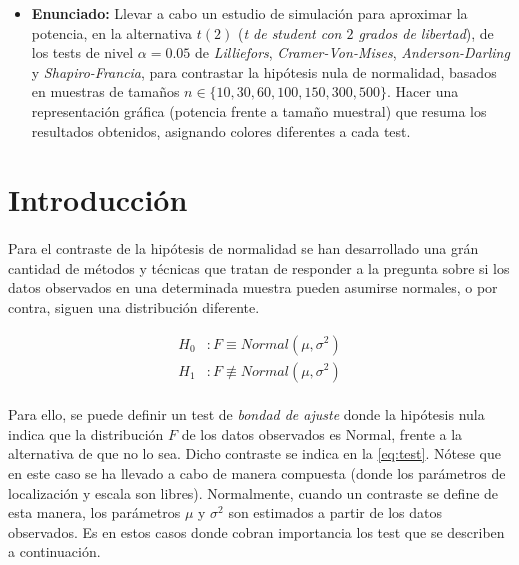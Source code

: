 \documentclass[a4paper, spanish]{article}
\begin{document}
  \maketitle
  \begin{itemize}
    \item \textbf{Enunciado:} Llevar a cabo un estudio de simulación para aproximar la potencia, en la alternativa $t(2)$ (\emph{t de student con $2$ grados de libertad}), de los tests de nivel $\alpha = 0.05$ de \emph{Lilliefors}, \emph{Cramer-Von-Mises}, \emph{Anderson-Darling} y \emph{Shapiro-Francia}, para contrastar la hipótesis nula de normalidad, basados en muestras de tamaños $n \in \{10, 30, 60, 100, 150, 300, 500\}$. Hacer una representación gráfica (potencia frente a tamaño muestral) que resuma los resultados obtenidos, asignando colores diferentes a cada test.
  \end{itemize}

  \section{Introducción}

    \paragraph{}
    Para el contraste de la hipótesis de normalidad se han desarrollado una grán cantidad de métodos y técnicas que tratan de responder a la pregunta sobre si los datos observados en una determinada muestra pueden asumirse normales, o por contra, siguen una distribución diferente.


    \begin{equation*}
    \label{eq:test}
      \begin{split}
        H_0&: F \equiv Normal(\mu, \sigma^2) \\
        H_1&: F \not\equiv Normal(\mu, \sigma^2)
      \end{split}
    \end{equation*}

    \paragraph{}
    Para ello, se puede definir un test de \emph{bondad de ajuste} donde la hipótesis nula indica que la distribución $F$ de los datos observados es Normal, frente a la alternativa de que no lo sea. Dicho contraste se indica en la \autoref{eq:test}. Nótese que en este caso se ha llevado a cabo de manera compuesta (donde los parámetros de localización y escala son libres). Normalmente, cuando un contraste se define de esta manera, los parámetros $\mu$ y $\sigma ^ 2$ son estimados a partir de los datos observados. Es en estos casos donde cobran importancia los test que se describen a continuación.
\end{document}
